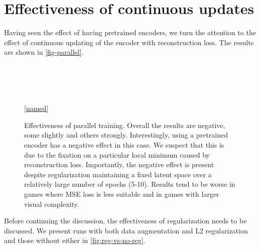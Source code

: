 \section{Effectiveness of continuous updates}
Having seen the effect of having pretrained encoders, we turn the attention
to the effect of continuous updating of the encoder with reconstruction loss.
The results are shown in \ref{fig-parallel}.

\begin{figure}[!t]
  \captionsetup[subfloat]{position=top,labelformat=empty}
  \centering

    \subfloat[]{  \resizebox{0.4\textwidth}{!}{}}
    \subfloat[]{  \resizebox{0.4\textwidth}{!}{}}\\
  \vspace{-1cm}
    \subfloat[]{  \resizebox{0.4\textwidth}{!}{}}
    \subfloat[]{  \resizebox{0.4\textwidth}{!}{}}\\
  \vspace{-1cm}
    \subfloat[]{  \resizebox{0.4\textwidth}{!}{}}
    \subfloat[]{  \resizebox{0.4\textwidth}{!}{}}\\
  \vspace{-1cm}
    \subfloat[]{  \resizebox{0.4\textwidth}{!}{}}
  \\

  \ref{named}
  \caption{Effectiveness of parallel training. Overall the results are negative, some slightly
  and others strongly. Interestingly, using a pretrained encoder has a negative effect
in this case. We suspect that this is due to the fixation on a particular local minimum caused
by reconstruction loss. Importantly, the negative effect is present despite
regularization maintaining a fixed latent space over a relatively large number of epochs (5-10).
Results tend to be worse in games where MSE loss is less suitable and in games
with larger visual complexity.}
  \label{fig:parallel}
\end{figure}

Before continuing the discussion, the effectiveness of regularization needs to be discussed.
We present runs with both data augmentation and L2 regularization and
those without either in \ref{fig:reg-vs-no-reg}.

